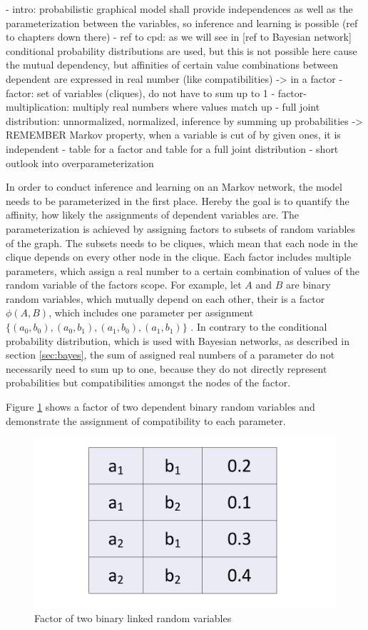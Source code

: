 - intro: probabilistic graphical model shall provide independences as well as the parameterization between the variables, so inference and learning is possible (ref to chapters down there)
- ref to cpd: as we will see in [ref to Bayesian network] conditional probability distributions are used, but this is not possible here cause the mutual dependency, but affinities of certain value combinations between dependent are expressed in real number (like compatibilities) -> in a factor
- factor: set of variables (cliques), do not have to sum up to 1
- factor-multiplication: multiply real numbers where values match up
- full joint distribution: unnormalized, normalized, inference by summing up probabilities -> REMEMBER Markov property, when a variable is cut of by given ones, it is independent
- table for a factor and table for a full joint distribution
- short outlook into overparameterization

In order to conduct inference and learning on an Markov network, the model needs to be parameterized in the first place. Hereby the goal is to quantify the affinity, how likely the assignments of dependent variables are. The parameterization is achieved by assigning factors to subsets of random variables of the graph. The subsets needs to be cliques, which mean that each node in the clique depends on every other node in the clique. Each factor includes multiple parameters, which assign a real number to a certain combination of values of the random variable of the factors scope. For example, let $A$ and $B$ are binary random variables, which mutually depend on each other, their is a factor $\phi(A,B)$, which includes one parameter per assignment $\{(a_0,b_0),(a_0,b_1),(a_1,b_0),(a_1,b_1)\}$ . In contrary to the conditional probability distribution, which is used with Bayesian networks, as described in section \ref{sec:bayes}, the sum of assigned real numbers of a parameter do not necessarily need to sum up to one, because they do not directly represent probabilities but compatibilities amongst the nodes of the factor.

Figure \ref{fig:param} shows a factor of two dependent binary random variables and demonstrate the assignment of compatibility to each parameter.

\begin{figure}[htpb]
  \centering
  	\includegraphics[scale=0.3]{img/param.pdf} 
  \caption{Factor of two binary linked random variables}
  \label{fig:param}
\end{figure}

